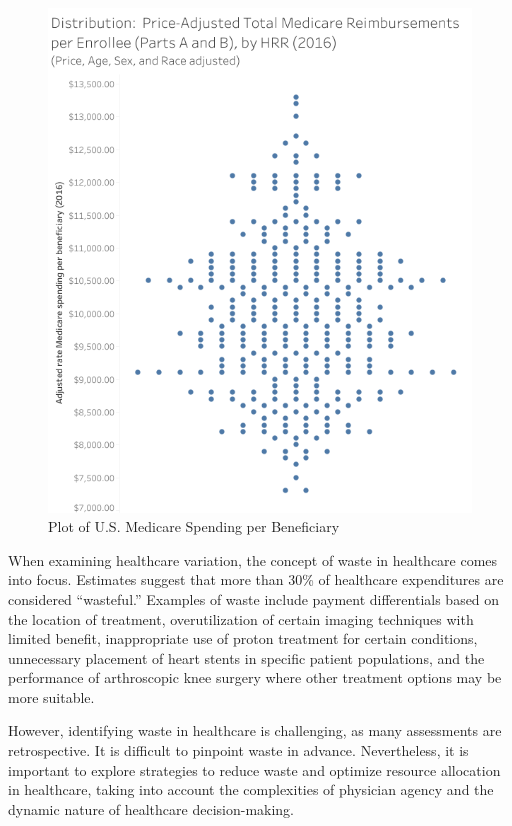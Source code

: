 \documentclass[
  letterpaper,
  DIV=11,
  numbers=noendperiod]{scrreport}
\theoremstyle{definition}
\theoremstyle{remark}
\begin{document}
\begin{figure}

{\centering \includegraphics{part2/../figures/dartmouth_dist.png}

}

\caption{\label{fig-variation2}Plot of U.S. Medicare Spending per
Beneficiary}

\end{figure}

When examining healthcare variation, the concept of waste in healthcare
comes into focus. Estimates suggest that more than 30\% of healthcare
expenditures are considered ``wasteful.'' Examples of waste include
payment differentials based on the location of treatment,
overutilization of certain imaging techniques with limited benefit,
inappropriate use of proton treatment for certain conditions,
unnecessary placement of heart stents in specific patient populations,
and the performance of arthroscopic knee surgery where other treatment
options may be more suitable.

However, identifying waste in healthcare is challenging, as many
assessments are retrospective. It is difficult to pinpoint waste in
advance. Nevertheless, it is important to explore strategies to reduce
waste and optimize resource allocation in healthcare, taking into
account the complexities of physician agency and the dynamic nature of
healthcare decision-making.
\end{document}

